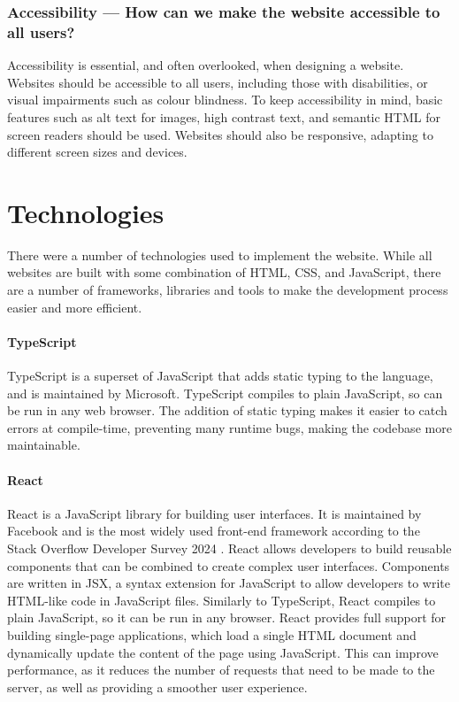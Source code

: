 \documentclass[../main.tex]{subfiles}
\begin{document}
            \subsubsection{Accessibility — How can we make the website accessible to all users?}
                Accessibility is essential, and often overlooked, when designing a website.
                Websites should be accessible to all users, including those with disabilities,
                    or visual impairments such as colour blindness.
                To keep accessibility in mind, basic features such as alt text for images, high
                    contrast text, and semantic HTML for screen readers should be used.
                Websites should also be responsive, adapting to different screen sizes and
                    devices.

    \section{Technologies}
        There were a number of technologies used to implement the website.
        While all websites are built with some combination of HTML, CSS, and
            JavaScript, there are a number of frameworks, libraries and tools to make the
            development process easier and more efficient.

        \paragraph*{TypeScript}
            TypeScript is a superset of JavaScript that adds static typing to the language,
                and is maintained by Microsoft.
            TypeScript compiles to plain JavaScript, so can be run in any web browser.
            The addition of static typing makes it easier to catch errors at compile-time,
                preventing many runtime bugs, making the codebase more maintainable.

        \paragraph*{React}
            React is a JavaScript library for building user interfaces.
            It is maintained by Facebook and is the most widely used front-end framework
                according to the Stack Overflow Developer Survey 2024 \citep{stackOverflow}.
            React allows developers to build reusable components that can be combined to
                create complex user interfaces.
            Components are written in JSX, a syntax extension for JavaScript to allow
                developers to write HTML-like code in JavaScript files.
            Similarly to TypeScript, React compiles to plain JavaScript, so it can be run
                in any browser.
            React provides full support for building single-page applications, which load a
                single HTML document and dynamically update the content of the page using
                JavaScript.
            This can improve performance, as it reduces the number of requests that need to
                be made to the server, as well as providing a smoother user experience.
\end{document}
